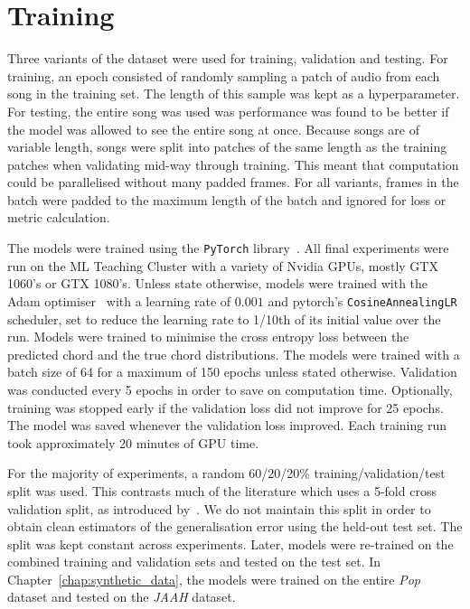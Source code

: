 \section{Training}

Three variants of the dataset were used for training, validation and testing. For training, an epoch consisted of randomly sampling a patch of audio from each song in the training set. The length of this sample was kept as a hyperparameter. For testing, the entire song was used was performance was found to be better if the model was allowed to see the entire song at once. Because songs are of variable length, songs were split into patches of the same length as the training patches when validating mid-way through training. This meant that computation could be parallelised without many padded frames. For all variants, frames in the batch were padded to the maximum length of the batch and ignored for loss or metric calculation.

The models were trained using the \texttt{PyTorch} library~\citep{pytorch}. All final experiments were run on the ML Teaching Cluster with a variety of Nvidia GPUs, mostly GTX 1060's or GTX 1080's. Unless state otherwise, models were trained with the Adam optimiser~\citep{adam} with a learning rate of $0.001$ and pytorch's \texttt{CosineAnnealingLR} scheduler, set to reduce the learning rate to 1/10th of its initial value over the run. Models were trained to minimise the cross entropy loss between the predicted chord and the true chord distributions. The models were trained with a batch size of 64 for a maximum of 150 epochs unless stated otherwise. Validation was conducted every 5 epochs in order to save on computation time. Optionally, training was stopped early if the validation loss did not improve for 25 epochs. The model was saved whenever the validation loss improved. Each training run took approximately 20 minutes of GPU time. 

For the majority of experiments, a random 60/20/20\% training/validation/test split was used. This contrasts much of the literature which uses a 5-fold cross validation split, as introduced by~\citet{FourTimelyInsights}. We do not maintain this split in order to obtain clean estimators of the generalisation error using the held-out test set. The split was kept constant across experiments. Later, models were re-trained on the combined training and validation sets and tested on the test set. In Chapter~\ref{chap:synthetic_data}, the models were trained on the entire \emph{Pop} dataset and tested on the \emph{JAAH} dataset.
